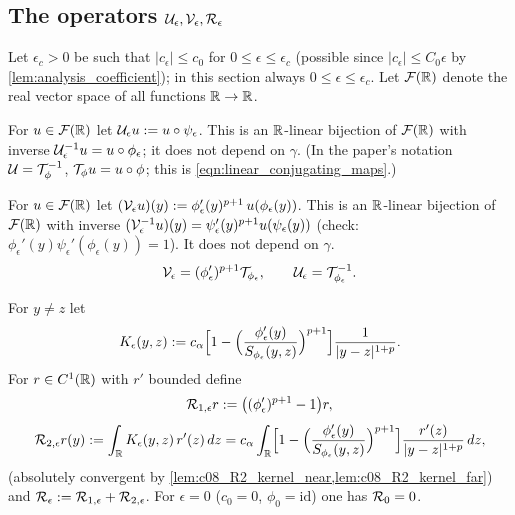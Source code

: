 \subsection{The operators $\mathcal{U}_\epsilon,\mathcal{V}_\epsilon,\mathcal{R}_\epsilon$}

Let $\epsilon_c>0$ be such that $|c_\epsilon|\le c_0$ for $0\le\epsilon\le\epsilon_c$ (possible since $|c_\epsilon|\le C_0\epsilon$ by
\cref{lem:analysis_coefficient}); in this section always $0\le\epsilon\le\epsilon_c$. Let
$\mathcal F(\mathbb{R})$ denote the real vector space of all functions $\mathbb{R}\to\mathbb{R}$.

\begin{definition}[$\mc U_\epsilon$]
  \label{def:U_eps}
  For $u\in\mathcal F(\mathbb{R})$ let $\mathcal{U}_\epsilon u:=u\circ\psi_\epsilon$. This is an $\mathbb{R}$-linear bijection of $\mathcal F(\mathbb{R})$
  with inverse $\mathcal{U}_\epsilon^{-1}u=u\circ\phi_\epsilon$; it does not depend on $\gamma$. (In the paper's notation
  $\mathcal{U}=\mathcal{T}_{\phi}^{-1}$, $\mathcal{T}_\phi u=u\circ\phi$; this is \eqref{eqn:linear_conjugating_maps}.)
\end{definition}

\begin{definition}[$\mc V_\epsilon$]
  \label{def:V_eps}
  For $u\in\mathcal F(\mathbb{R})$ let $(\mathcal{V}_\epsilon u)(y):=\phi_\epsilon'(y)^{p+1}\,u(\phi_\epsilon(y))$. This is an
  $\mathbb{R}$-linear bijection of $\mathcal F(\mathbb{R})$ with inverse
  $(\mathcal{V}_\epsilon^{-1}u)(y)=\psi_\epsilon'(y)^{p+1}u(\psi_\epsilon(y))$ (check: $\phi_\epsilon'(y)\psi_\epsilon'(\phi_\epsilon(y))=1$). It does
  not depend on $\gamma$.
  \begin{equation}\label{eqn:linear_conjugating_maps}
    \mathcal{V}_\epsilon=(\phi_\epsilon')^{p+1}\mathcal{T}_{\phi_\epsilon},\qquad \mathcal{U}_\epsilon=\mathcal{T}_{\phi_\epsilon}^{-1}.
  \end{equation}
\end{definition}

\begin{definition}
  \label{def:R_eps}
  For $y\neq z$ let
  \[
    K_\epsilon(y,z):=c_\alpha\Bigl[1-\Bigl(\frac{\phi_\epsilon'(y)}{S_{\phi_\epsilon}(y,z)}\Bigr)^{p+1}\Bigr]\frac1{|y-z|^{1+p}} .
  \]
  For $r\in C^1(\mathbb{R})$ with $r'$ bounded define
  \begin{equation}\label{eqn:linear_R1}
    \mathcal{R}_{1,\epsilon}r:=\bigl((\phi_\epsilon')^{p+1}-1\bigr)r,
  \end{equation}
  \begin{equation}\label{eqn:linear_R2}
    \mathcal{R}_{2,\epsilon}r(y):=\int_{\mathbb{R}} K_\epsilon(y,z)\,r'(z)\,dz
    =c_\alpha\int_{\mathbb{R}}\Bigl[1-\Bigl(\frac{\phi_\epsilon'(y)}{S_{\phi_\epsilon}(y,z)}\Bigr)^{p+1}\Bigr]\frac{r'(z)}{|y-z|^{1+p}}\,dz,
  \end{equation}
  (absolutely convergent by \cref{lem:c08_R2_kernel_near,lem:c08_R2_kernel_far}) and
  $\mathcal{R}_\epsilon:=\mathcal{R}_{1,\epsilon}+\mathcal{R}_{2,\epsilon}$. For $\epsilon=0$ ($c_0=0$, $\phi_0=\mathrm{id}$) one has $\mathcal{R}_0=0$.
\end{definition}


